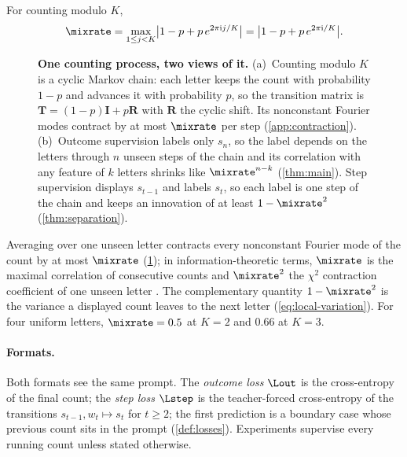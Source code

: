 \begin{definition}
\label{def:lambda}
For counting modulo $K$,
\begin{equation}
 \mixrate=\max_{1\le j<K}\bigl|1-p+p\,e^{2\pi\mathrm ij/K}\bigr|=\bigl|1-p+p\,e^{2\pi\mathrm i/K}\bigr|.
 \label{eq:lambda}
\end{equation}
\end{definition}

\begin{figure}[t]
\centering
\resizebox{\linewidth}{!}{}
\caption{\textbf{One counting process, two views of it.}
(a)~Counting modulo $K$ is a cyclic Markov chain: each letter keeps the count with probability $1-p$ and advances it with probability
$p$, so the transition matrix is $\mathbf T=(1-p)\mathbf I+p\mathbf R$ with $\mathbf R$ the cyclic shift. Its nonconstant Fourier modes
contract by at most $\mixrate$ per step (\cref{app:contraction}).
(b)~Outcome supervision labels only $s_n$, so the label depends on the letters through $n$ unseen steps of the chain and its
correlation with any feature of $k$ letters shrinks like $\mixrate^{n-k}$ (\cref{thm:main}). Step supervision displays $s_{t-1}$ and labels $s_t$, so each label is one
step of the chain and keeps an innovation of at least $1-\mixrate^2$ (\cref{thm:separation}).}
\label{fig:chain}
\end{figure}

Averaging over one unseen letter contracts every nonconstant Fourier mode of the count by at most $\mixrate$ (\cref{fig:chain}); in information-theoretic terms,
$\mixrate$ is the maximal correlation of consecutive counts and $\mixrate^2$ the $\chi^2$ contraction coefficient of one
unseen letter \citep{witsenhausen1975sequences,raginsky2016strong}. The complementary quantity $1-\mixrate^2$ is the
variance a displayed count leaves to the next letter (\cref{eq:local-variation}). For four uniform letters,
$\mixrate=0.5$ at $K=2$ and $0.66$ at $K=3$.

\paragraph{Formats.} Both formats see the same prompt. The \emph{outcome loss} $\Lout$ is the cross-entropy of the final
count; the \emph{step loss} $\Lstep$ is the teacher-forced cross-entropy of the transitions $s_{t-1},w_t\mapsto s_t$ for
$t\ge2$; the first prediction is a boundary case whose previous count sits in the prompt (\cref{def:losses}). Experiments
supervise every running count unless stated otherwise.

